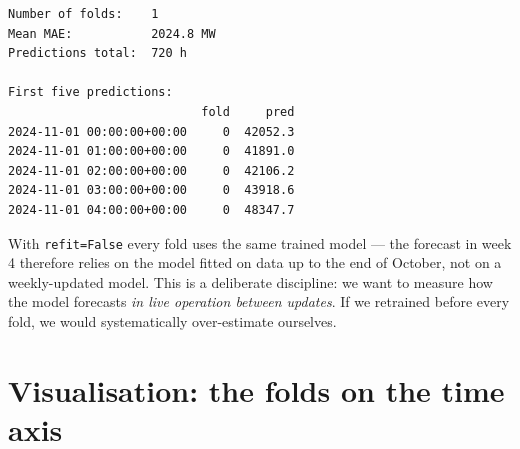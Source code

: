 \documentclass[
  english,
  letterpaper,
]{scrbook}
\begin{document}
\begin{verbatim}
Number of folds:    1
Mean MAE:           2024.8 MW
Predictions total:  720 h

First five predictions:
                           fold     pred
2024-11-01 00:00:00+00:00     0  42052.3
2024-11-01 01:00:00+00:00     0  41891.0
2024-11-01 02:00:00+00:00     0  42106.2
2024-11-01 03:00:00+00:00     0  43918.6
2024-11-01 04:00:00+00:00     0  48347.7
\end{verbatim}

\begin{tcolorbox}[enhanced jigsaw, arc=.35mm, bottomrule=.15mm, bottomtitle=1mm, breakable, colback=white, colbacktitle=quarto-callout-note-color!10!white, colframe=quarto-callout-note-color-frame, coltitle=black, left=2mm, leftrule=.75mm, opacityback=0, opacitybacktitle=0.6, rightrule=.15mm, title=\textcolor{quarto-callout-note-color}{\faInfo}\hspace{0.5em}{\texttt{refit=False} and CR-2}, titlerule=0mm, toprule=.15mm, toptitle=1mm]

With \texttt{refit=False} every fold uses the same trained model --- the
forecast in week 4 therefore relies on the model fitted on data up to
the end of October, not on a weekly-updated model. This is a deliberate
discipline: we want to measure how the model forecasts \emph{in live
operation between updates}. If we retrained before every fold, we would
systematically over-estimate ourselves.

\end{tcolorbox}

\section{Visualisation: the folds on the time
axis}\label{visualisation-the-folds-on-the-time-axis}
\end{document}

